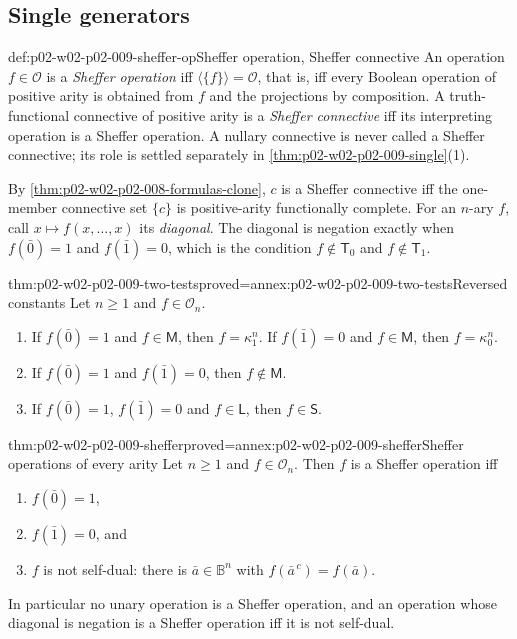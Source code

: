 \subsection{Single generators}
\label{sec:p02-w02-p02-009-single-generators}

\begin{hbdefinition}{def:p02-w02-p02-009-sheffer-op}{Sheffer operation, Sheffer connective}
An operation \(f\in\mathcal O\) is a \emph{Sheffer operation} iff
\(\langle\{f\}\rangle=\mathcal O\), that is, iff every Boolean operation of
positive arity is obtained from \(f\) and the projections by composition.
A truth-functional connective of positive arity is a \emph{Sheffer
connective} iff its interpreting operation is a Sheffer operation.  A
nullary connective is never called a Sheffer connective; its role is settled
separately in \cref{thm:p02-w02-p02-009-single}(1).
\end{hbdefinition}

By \cref{thm:p02-w02-p02-008-formulas-clone}, \(c\) is a Sheffer connective
iff the one-member connective set \(\{c\}\) is positive-arity functionally
complete.  For an \(n\)-ary \(f\), call \(x\mapsto f(x,\ldots,x)\) its
\emph{diagonal}.  The diagonal is negation exactly when \(f(\bar0)=1\) and
\(f(\bar1)=0\), which is the condition \(f\notin\mathsf T_0\) and
\(f\notin\mathsf T_1\).

\begin{hblemma}{thm:p02-w02-p02-009-two-tests}{proved=annex:p02-w02-p02-009-two-tests}{Reversed constants}
Let \(n\geq1\) and \(f\in\mathcal O_n\).
\begin{enumerate}
\item If \(f(\bar0)=1\) and \(f\in\mathsf M\), then \(f=\kappa^n_1\).  If
  \(f(\bar1)=0\) and \(f\in\mathsf M\), then \(f=\kappa^n_0\).
\item If \(f(\bar0)=1\) and \(f(\bar1)=0\), then \(f\notin\mathsf M\).
\item If \(f(\bar0)=1\), \(f(\bar1)=0\) and \(f\in\mathsf L\), then
  \(f\in\mathsf S\).
\end{enumerate}
\end{hblemma}

\begin{hbtheorem}{thm:p02-w02-p02-009-sheffer}{proved=annex:p02-w02-p02-009-sheffer}{Sheffer operations of every arity}
Let \(n\geq1\) and \(f\in\mathcal O_n\).  Then \(f\) is a Sheffer operation
iff
\begin{enumerate}
\item \(f(\bar0)=1\),
\item \(f(\bar1)=0\), and
\item \(f\) is not self-dual: there is \(\bar a\in\mathbb B^n\) with
  \(f(\bar a^{\,c})=f(\bar a)\).
\end{enumerate}
In particular no unary operation is a Sheffer operation, and an operation
whose diagonal is negation is a Sheffer operation iff it is not self-dual.
\end{hbtheorem}

